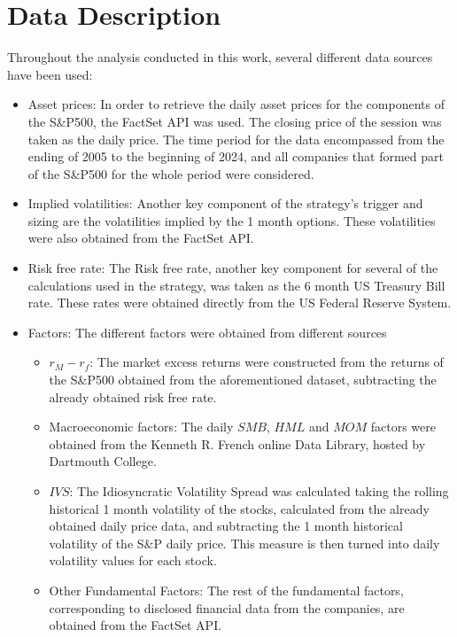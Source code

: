 \section{Data Description}
\label{sec:data-description}
Throughout the analysis conducted in this work, several different data sources have been used:
\begin{itemize}
    \item Asset prices: In order to retrieve the daily asset prices for the components of the S\&P500, the FactSet API was used. The closing price of the session was taken as the daily price. The time period for the data encompassed from the ending of 2005 to the beginning of 2024, and all companies that formed part of the S\&P500 for the whole period were considered. 
    \item Implied volatilities: Another key component of the strategy's trigger and sizing are the volatilities implied by the 1 month options. These volatilities were also obtained from the FactSet API. 
    \item Risk free rate: The Risk free rate, another key component for several of the calculations used in the strategy, was taken as the 6 month US Treasury Bill rate. These rates were obtained directly from the US Federal Reserve System.
    \item Factors: The different factors were obtained from different sources
    \begin{itemize}
        \item $r_M-r_f$: The market excess returns were constructed from the returns of the S\&P500 obtained from the aforementioned dataset, subtracting the already obtained risk free rate.
        \item Macroeconomic factors: The daily $SMB$, $HML$ and $MOM$ factors were obtained from the Kenneth R. French online Data Library, hosted by Dartmouth College.
        \item $IVS$: The Idiosyncratic Volatility Spread was calculated taking the rolling historical 1 month volatility of the stocks, calculated from the already obtained daily price data, and subtracting the 1 month historical volatility of the S\&P daily price. This measure is then turned into daily volatility values for each stock. 
        \item Other Fundamental Factors: The rest of the fundamental factors, corresponding to disclosed financial data from the companies, are obtained from the FactSet API. 
    \end{itemize}
\end{itemize}